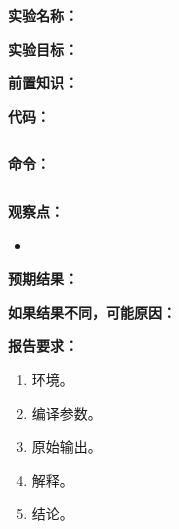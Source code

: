 \begin{labbox}
\textbf{实验名称：}

\textbf{实验目标：}

\textbf{前置知识：}

\textbf{代码：}

\begin{lstlisting}[language=C++]
\end{lstlisting}

\textbf{命令：}

\begin{lstlisting}[language=bash]
\end{lstlisting}

\textbf{观察点：}

\begin{itemize}
  \item 
\end{itemize}

\textbf{预期结果：}

\textbf{如果结果不同，可能原因：}

\textbf{报告要求：}

\begin{enumerate}
  \item 环境。
  \item 编译参数。
  \item 原始输出。
  \item 解释。
  \item 结论。
\end{enumerate}
\end{labbox}

